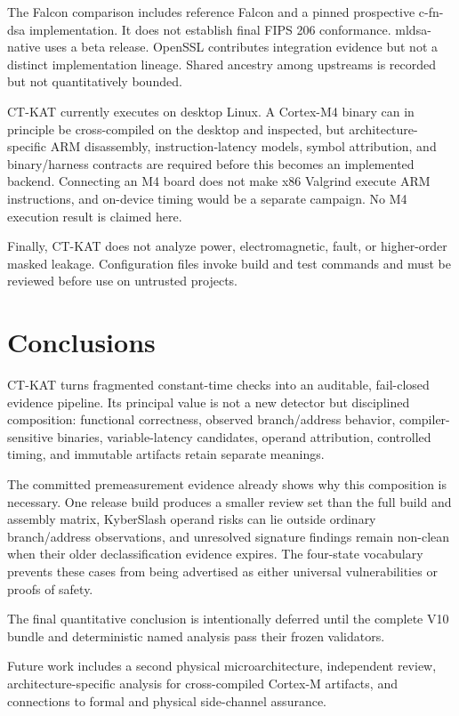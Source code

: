 \documentclass[cryptography,article,submit,moreauthors]{Definitions/mdpi}
\newif\ifNativeResultsAvailable
\begin{document}
The Falcon comparison includes reference Falcon and a pinned prospective
c-fn-dsa implementation. It does not establish final FIPS 206 conformance.
mldsa-native uses a beta release. OpenSSL contributes integration evidence but
not a distinct implementation lineage. Shared ancestry among upstreams is
recorded but not quantitatively bounded.

CT-KAT currently executes on desktop Linux. A Cortex-M4 binary can in principle
be cross-compiled on the desktop and inspected, but architecture-specific ARM
disassembly, instruction-latency models, symbol attribution, and binary/harness
contracts are required before this becomes an implemented backend. Connecting
an M4 board does not make x86 Valgrind execute ARM instructions, and on-device
timing would be a separate campaign. No M4 execution result is claimed here.

Finally, CT-KAT does not analyze power, electromagnetic, fault, or higher-order
masked leakage. Configuration files invoke build and test commands and must be
reviewed before use on untrusted projects.

\section{Conclusions}
\label{sec:conclusions}

CT-KAT turns fragmented constant-time checks into an auditable, fail-closed
evidence pipeline. Its principal value is not a new detector but disciplined
composition: functional correctness, observed branch/address behavior,
compiler-sensitive binaries, variable-latency candidates, operand attribution,
controlled timing, and immutable artifacts retain separate meanings.

The committed premeasurement evidence already shows why this composition is
necessary. One release build produces a smaller review set than the full build
and assembly matrix, KyberSlash operand risks can lie outside ordinary
branch/address observations, and unresolved signature findings remain
non-clean when their older declassification evidence expires. The four-state
vocabulary prevents these cases from being advertised as either universal
vulnerabilities or proofs of safety.

\ifNativeResultsAvailable
The complete V10 result in Section~\ref{sec:native-results} adds three valid,
mixed-input ML-KEM risk signals and 25 valid no-finding observations. The
result demonstrates why an axis label is part of a security claim: a large
\texttt{valid\_tuple} timing difference does not by itself identify secret-key
influence, while a negative operand canary on one CPU does not remove static
evidence of a variable-latency mechanism.
\else
The final quantitative conclusion is intentionally deferred until the complete
V10 bundle and deterministic named analysis pass their frozen validators.
\fi
Future work includes a second physical microarchitecture, independent review,
architecture-specific analysis for cross-compiled Cortex-M artifacts, and
connections to formal and physical side-channel assurance.
\end{document}
